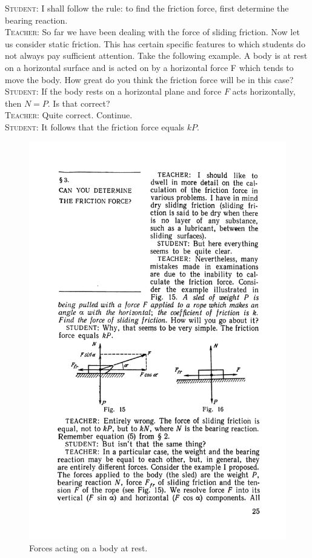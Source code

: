 \documentclass[a4paper,sfsidenotes]{tufte-book}
\begin{document}
\textsc{Student:} I shall follow the rule: to find the friction force, first determine the bearing reaction.
\\
\textsc{Teacher:} So far we have been dealing with the force of sliding friction. Now let us consider static friction. This has certain specific features to which students do not always pay
sufficient attention. Take the following example. A body is at rest on a horizontal surface and is acted on by a horizontal force F which tends to move the body. How great do you think the friction force will be in this case?
\\
\textsc{Student:} If the body rests on a horizontal plane and force $F$ acts horizontally, then $N=P$. Is that correct?
\\
\textsc{Teacher:} Quite correct. Continue.
\\
\textsc{Student:} It follows that the friction force equals $kP$.
\begin{figure}
\centering
\includegraphics[width=0.55\linewidth]{fig-016a.pdf}
\caption{Forces acting on a body at rest.}
\label{fig-16}
\end{figure}
\end{document}
